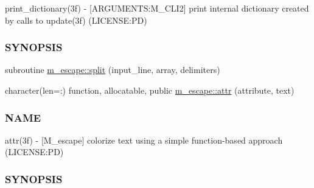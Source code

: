 \begin{DoxyCompactItemize}
\begin{DoxyCompactList}
print\+\_\+dictionary(3f) -\/ \mbox{[}A\+R\+G\+U\+M\+E\+N\+TS\+:M\+\_\+\+C\+L\+I2\mbox{]} print internal dictionary created by calls to update(3f) (L\+I\+C\+E\+N\+SE\+:PD) \subsubsection*{S\+Y\+N\+O\+P\+S\+IS}\end{DoxyCompactList}\item 
subroutine \mbox{\hyperlink{namespacem__escape_af23bd97702864e0f32258e6ec0d51506}{m\+\_\+escape\+::split}} (input\+\_\+line, array, delimiters)
\item 
character(len=\+:) function, allocatable, public \mbox{\hyperlink{namespacem__escape_a916b16ce9be553d669f54cb9575a91be}{m\+\_\+escape\+::attr}} (attribute, text)
\begin{DoxyCompactList}\small\item\em \subsubsection*{N\+A\+ME}

attr(3f) -\/ \mbox{[}M\+\_\+escape\mbox{]} colorize text using a simple function-\/based approach (L\+I\+C\+E\+N\+SE\+:PD) \subsubsection*{S\+Y\+N\+O\+P\+S\+IS}\end{DoxyCompactList}\end{DoxyCompactItemize}

